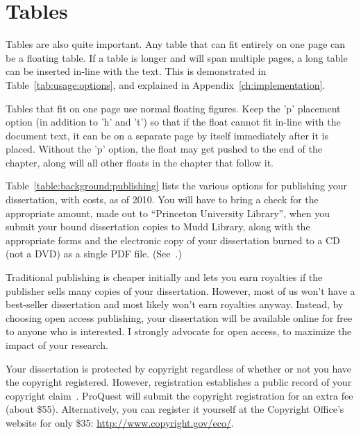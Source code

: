 \section{Tables}
\label{sec:background:tables}

Tables are also quite important. Any table that can fit entirely on one page can be a floating table. If a table is longer and will span multiple pages, a long table can be inserted in-line with the text. This is demonstrated in Table~\ref{tab:usage:options}, and explained in Appendix~\ref{ch:implementation}.

Tables that fit on one page use normal floating figures. Keep the 'p' placement option (in addition to 'h' and 't') so that if the float cannot fit in-line with the document text, it can be on a separate page by itself immediately after it is placed. Without the 'p' option, the float may get pushed to the end of the chapter, along will all other floats in the chapter that follow it.

Table~\ref{table:background:publishing} lists the various options for publishing your dissertation, with costs, as of 2010. You will have to bring a check for the appropriate amount, made out to ``Princeton University Library'', when you submit your bound dissertation copies to Mudd Library, along with the appropriate forms and the electronic copy of your dissertation burned to a CD (not a DVD) as a single PDF file. (See~\cite{muddthesis2009}.)

Traditional publishing is cheaper initially and lets you earn royalties if the publisher sells many copies of your dissertation. However, most of us won't have a best-seller dissertation and most likely won't earn royalties anyway. Instead, by choosing open access publishing, your dissertation will be available online for free to anyone who is interested. I strongly advocate for open access, to maximize the impact of your research.

Your dissertation is protected by copyright regardless of whether or not you have the copyright registered. However, registration establishes a public record of your copyright claim~\cite{muddthesis2009}. ProQuest will submit the copyright registration for an extra fee (about \$55). Alternatively, you can register it yourself at the Copyright Office's website for only \$35: \url{http://www.copyright.gov/eco/}.

